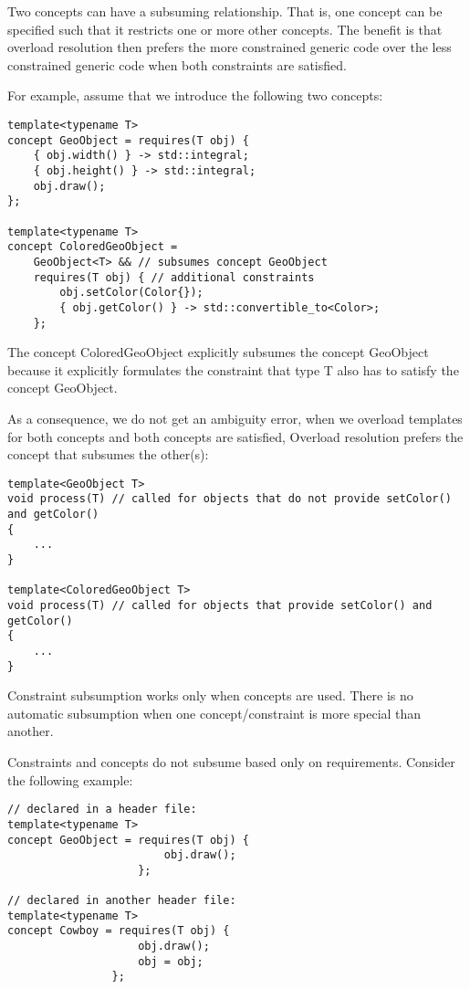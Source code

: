 
Two concepts can have a subsuming relationship. That is, one concept can be specified such that it restricts one or more other concepts. The benefit is that overload resolution then prefers the more constrained generic code over the less constrained generic code when both constraints are satisfied.

For example, assume that we introduce the following two concepts:

\begin{lstlisting}[style=styleCXX]
template<typename T>
concept GeoObject = requires(T obj) {
	{ obj.width() } -> std::integral;
	{ obj.height() } -> std::integral;
	obj.draw();
};

template<typename T>
concept ColoredGeoObject =
	GeoObject<T> && // subsumes concept GeoObject
	requires(T obj) { // additional constraints
		obj.setColor(Color{});
		{ obj.getColor() } -> std::convertible_to<Color>;
	};
\end{lstlisting}

The concept ColoredGeoObject explicitly subsumes the concept GeoObject because it explicitly formulates the constraint that type T also has to satisfy the concept GeoObject.

As a consequence, we do not get an ambiguity error, when we overload templates for both concepts and both concepts are satisfied, Overload resolution prefers the concept that subsumes the other(s):

\begin{lstlisting}[style=styleCXX]
template<GeoObject T>
void process(T) // called for objects that do not provide setColor() and getColor()
{
	...
}

template<ColoredGeoObject T>
void process(T) // called for objects that provide setColor() and getColor()
{
	...
}
\end{lstlisting}

Constraint subsumption works only when concepts are used. There is no automatic subsumption when one concept/constraint is more special than another.

Constraints and concepts do not subsume based only on requirements. Consider the following example:

\begin{lstlisting}[style=styleCXX]
// declared in a header file:
template<typename T>
concept GeoObject = requires(T obj) {
						obj.draw();
					};
					
// declared in another header file:
template<typename T>
concept Cowboy = requires(T obj) {
					obj.draw();
					obj = obj;
				};
\end{lstlisting}

